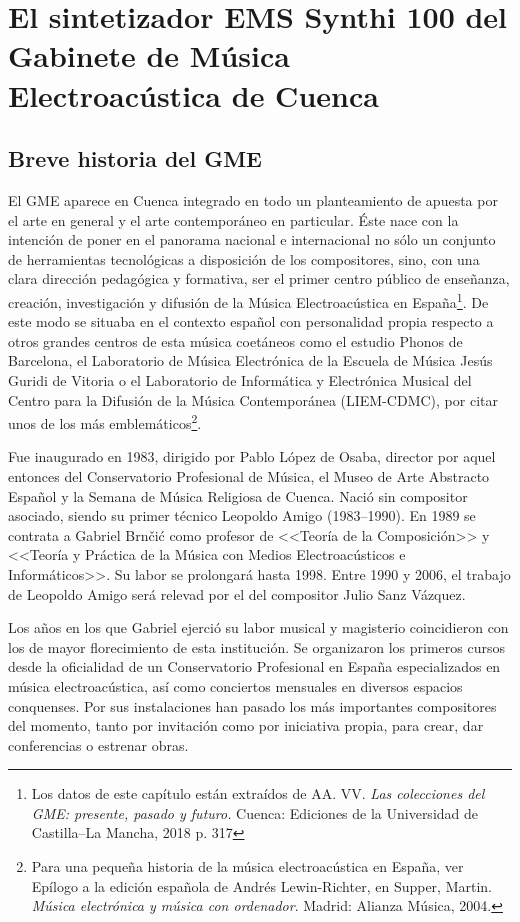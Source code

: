 \chapter{El sintetizador EMS Synthi 100 del Gabinete de Música Electroacústica de Cuenca}

\section{Breve historia del GME}

El GME aparece en Cuenca integrado en todo un planteamiento de apuesta por el arte en general y el arte contemporáneo en particular. Éste nace con la intención de poner en el panorama nacional e internacional no sólo un conjunto de herramientas tecnológicas a disposición de los compositores, sino, con una clara dirección pedagógica y formativa, ser el primer centro público de enseñanza, creación, investigación y difusión de la Música Electroacústica en España\footnote{Los datos de este capítulo están extraídos de AA. VV. \textit{Las colecciones del GME: presente, pasado y futuro.} Cuenca: Ediciones de la Universidad de Castilla--La Mancha, 2018 p. 317}. De este modo se situaba en el contexto español con personalidad propia respecto a otros grandes centros de esta música coetáneos como el estudio Phonos de Barcelona, el Laboratorio de Música Electrónica de la Escuela de Música Jesús Guridi de Vitoria o el Laboratorio de Informática y Electrónica Musical del Centro para la Difusión de la Música Contemporánea (LIEM-CDMC), por citar unos de los más emblemáticos\footnote{Para una pequeña historia de la música electroacústica en España, ver Epílogo a la edición española de Andrés Lewin-Richter, en Supper, Martin.\textit{ Música electrónica y música con ordenador}. Madrid: Alianza Música, 2004.}.

Fue inaugurado en 1983, dirigido por Pablo López de Osaba, director por aquel entonces del Conservatorio Profesional de Música, el Museo de Arte Abstracto Español y la Semana de Música Religiosa de Cuenca. Nació sin compositor asociado, siendo su primer técnico Leopoldo Amigo (1983--1990). En 1989 se contrata a Gabriel Brnčić como profesor de <<Teoría de la Composición>> y <<Teoría y Práctica de la Música con Medios Electroacústicos e Informáticos>>. Su labor se prolongará hasta 1998. Entre 1990 y 2006, el trabajo de Leopoldo Amigo será relevad por el del compositor Julio Sanz Vázquez. 

Los años en los que Gabriel ejerció su labor musical y magisterio coincidieron con los de mayor florecimiento de esta institución. Se organizaron los primeros cursos desde la oficialidad de un Conservatorio Profesional en España especializados en música electroacústica, así como conciertos mensuales en diversos espacios conquenses. Por sus instalaciones han pasado los más importantes compositores del momento, tanto por invitación como por iniciativa propia, para crear, dar conferencias o estrenar obras.

